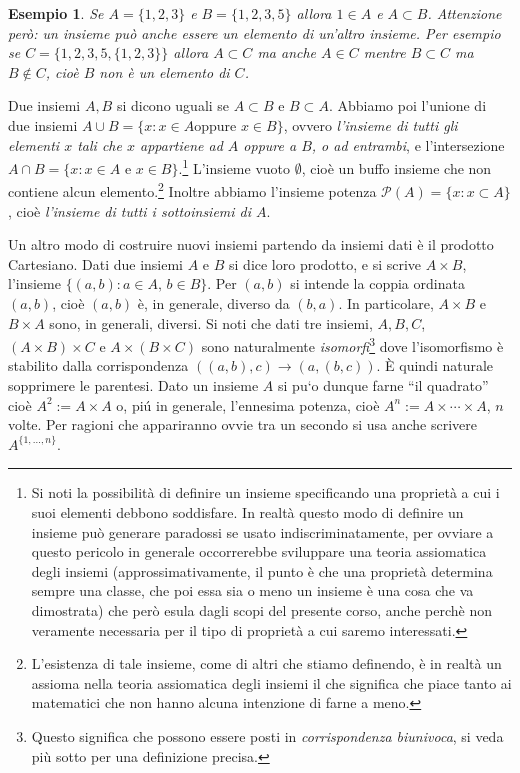 \documentclass{amsart}
\newtheorem{exmp}[thm]{Esempio}
\newcommand\Pa{{\mathcal P}}
\begin{document}
\begin{exmp}
Se $A=\{1,2,3\}$ e $B=\{1,2,3,5\}$ allora $1\in A$ e $A\subset
B$. Attenzione per\`o: un insieme pu\`o anche essere un elemento di
un'altro insieme. Per esempio se $C=\{1,2,3, 5,\{1,2,3\}\}$ allora
$A\subset C$ ma anche $A\in C$ mentre $B\subset C$ ma $B\not\in C$,
cio\`e \emph{$B$ non \`e un elemento di $C$}.
\end{exmp}
 
Due insiemi $A,B$ si dicono uguali se $A\subset B$ e $B\subset
A$. Abbiamo poi l'unione di due insiemi $A\cup B=\{x: x\in A \text{
oppure } x\in B\}$, ovvero \emph{l'insieme di tutti gli elementi $x$
tali che $x$ appartiene ad $A$ oppure a $B$, o ad entrambi}, e
l'intersezione $A\cap B=\{x: x\in A \text{ 
e } x\in B\}$.\footnote{Si noti la possibilit\`a di definire un
insieme specificando una propriet\`a a cui i suoi elementi debbono
soddisfare. In realt\`a questo modo di definire un insieme pu\`o
generare paradossi se usato indiscriminatamente, per ovviare a questo
pericolo in generale occorrerebbe sviluppare una teoria assiomatica degli
insiemi (approssimativamente, il punto \`e che una propriet\`a
determina sempre una classe, che poi essa sia o meno un insieme \`e una cosa
che va dimostrata) che per\`o esula dagli scopi del presente corso,
anche perch\`e non veramente
necessaria per il tipo di propriet\`a a cui saremo interessati.} 
L'insieme vuoto $\emptyset$, cio\`e un buffo insieme che
non contiene alcun elemento.\footnote{L'esistenza di tale insieme,
come di altri che stiamo definendo, \`e in realt\`a un assioma nella
teoria assiomatica degli insiemi il che significa che piace tanto ai
matematici che non hanno alcuna intenzione di farne a meno.} Inoltre
abbiamo l'insieme potenza $\Pa(A)=\{x:x\subset A\}$, cio\`e
\emph{l'insieme di tutti i sottoinsiemi di $A$}.

Un altro modo di costruire nuovi insiemi partendo da insiemi dati \`e
il prodotto Cartesiano. Dati due insiemi $A$ e $B$ si dice loro
prodotto, e si scrive $A\times B$, l'insieme $\{(a,b):a\in A,\, b\in
B\}$. Per $(a,b)$ si intende la coppia ordinata $(a,b)$, cio\`e
$(a,b)$ \`e, in generale, diverso da $(b,a)$. In particolare, $A\times
B$ e $B\times A$ sono, in generali, diversi. Si noti che dati tre
insiemi, $A,B,C$,  $(A\times B)\times C$ e $A\times (B\times C)$ sono
naturalmente {\em isomorfi}\footnote{Questo significa che possono
essere posti in {\em corrispondenza biunivoca}, si veda pi\`u sotto per
una definizione precisa.} dove l'isomorfismo \`e stabilito dalla
corrispondenza $((a,b),c)\to (a,(b,c))$. \`E quindi naturale
sopprimere le parentesi. Dato un insieme $A$ si pu`o dunque farne ``il
quadrato'' cio\`e $A^2:=A\times A$ o, pi\'u in generale, l'ennesima
potenza, cio\`e $A^n:=A\times
\cdots \times A$, $n$ volte. Per ragioni che appariranno ovvie tra un
secondo si usa anche scrivere $A^{\{1,\dots,n\}}$.
\end{document}
